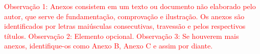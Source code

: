 \textcolor{red}{Observação 1: Anexos consistem em um texto ou documento não elaborado pelo autor, que serve de fundamentação, comprovação e ilustração. Os anexos são identificados por letras maiúsculas consecutivas, travessão e pelos respectivos títulos. Observação 2: Elemento opcional. Observação 3: Se houverem mais anexos, identifique-os como Anexo B, Anexo C e assim por diante.}